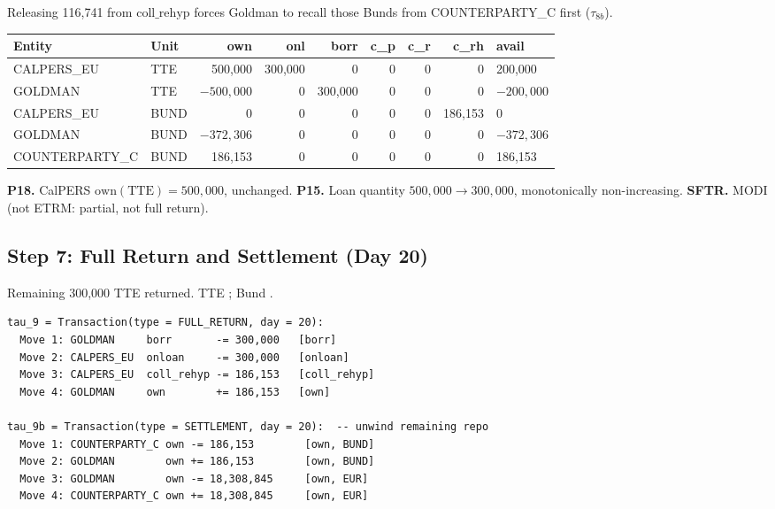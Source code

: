 \noindent Releasing 116{,}741 from $\mathrm{coll\_rehyp}$ forces Goldman to recall those Bunds from COUNTERPARTY\_C first ($\tau_{8b}$).

\begin{center}\small
\begin{tabular}{l l r r r r r r l}
\toprule
\textbf{Entity} & \textbf{Unit} & own & onl & borr & c\_p & c\_r & c\_rh & avail \\
\midrule
CALPERS\_EU & TTE & 500{,}000 & 300{,}000 & 0 & 0 & 0 & 0 & 200{,}000 \\
GOLDMAN & TTE & $-500{,}000$ & 0 & 300{,}000 & 0 & 0 & 0 & $-200{,}000$ \\
CALPERS\_EU & BUND & 0 & 0 & 0 & 0 & 0 & 186{,}153 & 0 \\
GOLDMAN & BUND & $-372{,}306$ & 0 & 0 & 0 & 0 & 0 & $-372{,}306$ \\
COUNTERPARTY\_C & BUND & 186{,}153 & 0 & 0 & 0 & 0 & 0 & 186{,}153 \\
\bottomrule
\end{tabular}
\end{center}

\noindent\textbf{P18.} CalPERS $\mathrm{own}(\text{TTE}) = 500{,}000$, unchanged. \checkmark\quad
\textbf{P15.} Loan quantity $500{,}000 \to 300{,}000$, monotonically non-increasing. \checkmark\quad
\textbf{SFTR.} MODI (not ETRM: partial, not full return).

\subsection{Step 7: Full Return and Settlement (Day 20)}
\label{sec:eu-step7}

Remaining 300{,}000 TTE returned. TTE ; Bund .

\begin{lstlisting}
tau_9 = Transaction(type = FULL_RETURN, day = 20):
  Move 1: GOLDMAN     borr       -= 300,000   [borr]
  Move 2: CALPERS_EU  onloan     -= 300,000   [onloan]
  Move 3: CALPERS_EU  coll_rehyp -= 186,153   [coll_rehyp]
  Move 4: GOLDMAN     own        += 186,153   [own]

tau_9b = Transaction(type = SETTLEMENT, day = 20):  -- unwind remaining repo
  Move 1: COUNTERPARTY_C own -= 186,153        [own, BUND]
  Move 2: GOLDMAN        own += 186,153        [own, BUND]
  Move 3: GOLDMAN        own -= 18,308,845     [own, EUR]
  Move 4: COUNTERPARTY_C own += 18,308,845     [own, EUR]
\end{lstlisting}

